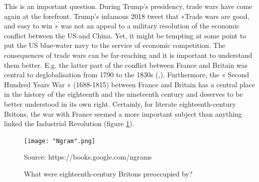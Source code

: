 \documentclass[12pt,a4paper,notitlepage,english]{article}
\newcommand{\source}[1]{\caption*{\footnotesize Source: {#1}} }
\begin{document}
This is an important question.
During Trump’s presidency, trade wars have come again at the forefront.
Trump’s infamous 2018 tweet that «Trade wars are good, and easy to win » was not an appeal to a military resolution of the economic conflict between the US and China.
Yet, it might be tempting at some point to put the US blue-water navy to the service of economic competition.
The consequences of trade wars can be far-reaching and it is important to understand them better.
E.g. the latter part of the conflict between France and Britain was central to deglobalisation from 1790 to the 1830s (\cite{ORourke2006},\cite[table 4.5]{ORourke2010}).
Furthermore, the « Second Hundred Years War » (1688-1815) between France and Britain has a central place in the history of the eighteenth and the nineteenth century and deserves to be better understood in its own right.
Certainly, for literate eighteenth-century Britons, the war with France seemed a more important subject than anything linked the Industrial Revolution (figure \ref{Ngram}).

\begin{figure}[h!]
	\caption{What were eighteenth-century Britons preoccupied by?}
	\centering
	\texttt{[image: "Ngram".png]}
	\source{https://books.google.com/ngrams}
	\label{Ngram}
\end{figure}





\end{document}
